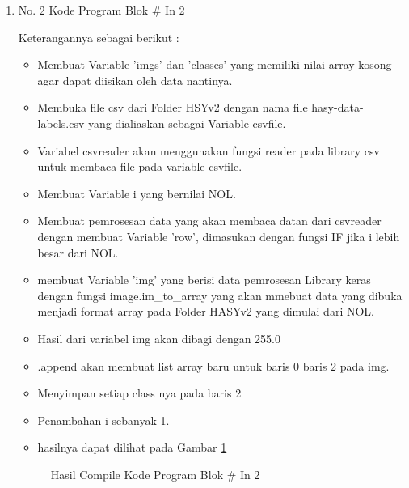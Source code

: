 \begin{enumerate}
\item No. 2 Kode Program Blok \# In 2
\par 
Keterangannya sebagai berikut :
\begin{itemize}
\item Membuat Variable 'imgs' dan 'classes' yang memiliki nilai array kosong agar dapat diisikan oleh data nantinya.
\item Membuka file csv dari Folder HSYv2 dengan nama file hasy-data-labels.csv yang dialiaskan sebagai Variable csvfile.
\item Variabel csvreader akan menggunakan fungsi reader pada library csv untuk membaca file pada variable csvfile.
\item Membuat Variable i yang bernilai NOL.
\item Membuat pemrosesan data yang akan membaca datan dari csvreader dengan membuat Variable 'row', dimasukan dengan fungsi IF jika i lebih besar dari NOL.
\item membuat Variable 'img' yang berisi data pemrosesan Library keras dengan fungsi image.im\_to\_array yang akan mmebuat data yang dibuka menjadi format array pada Folder HASYv2 yang dimulai dari NOL.
\item Hasil dari variabel img akan dibagi dengan 255.0
\item .append akan membuat list array baru untuk baris 0 baris 2 pada img.
\item Menyimpan setiap class nya  pada baris 2
\item Penambahan i sebanyak 1. 
\item hasilnya dapat dilihat pada Gambar \ref{refer13}
\end{itemize}

\begin{figure}[!htbp]
      \caption{Hasil Compile Kode Program Blok \# In 2}
      \label{refer13}
\end{figure}


\end{enumerate}
